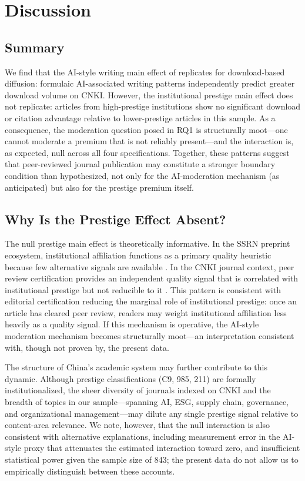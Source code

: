 \documentclass[12pt,a4paper]{article}
\begin{document}
\section{Discussion}
\label{sec:discussion}

\subsection{Summary}

We find that the AI-style writing main effect of \citet{JoLi2026}
replicates for download-based diffusion: formulaic AI-associated
writing patterns independently predict greater download volume on CNKI.
However, the institutional prestige main effect does not replicate:
articles from high-prestige institutions show no significant download
or citation advantage relative to lower-prestige articles in this sample.
As a consequence, the moderation question posed in RQ1 is structurally
moot---one cannot moderate a premium that is not reliably present---and
the interaction is, as expected, null across all four specifications.
Together, these patterns suggest that peer-reviewed journal publication
may constitute a stronger boundary condition than hypothesized, not only
for the AI-moderation mechanism (as anticipated) but also for the
prestige premium itself.

\subsection{Why Is the Prestige Effect Absent?}

The null prestige main effect is theoretically informative.
In the SSRN preprint ecosystem, institutional affiliation functions as
a primary quality heuristic because few alternative signals are
available \citep{JoLi2026}.
In the CNKI journal context, peer review certification provides an
independent quality signal that is correlated with institutional
prestige but not reducible to it \citep{Bornmann2008}.
This pattern is consistent with editorial certification reducing the
marginal role of institutional prestige: once an article has cleared
peer review, readers may weight institutional affiliation less heavily
as a quality signal.
If this mechanism is operative, the AI-style moderation mechanism
becomes structurally moot---an interpretation consistent with, though
not proven by, the present data.

The structure of China's academic system may further contribute to
this dynamic.
Although prestige classifications (C9, 985, 211) are formally
institutionalized, the sheer diversity of journals indexed on CNKI
and the breadth of topics in our sample---spanning AI, ESG, supply
chain, governance, and organizational management---may dilute any
single prestige signal relative to content-area relevance.
We note, however, that the null interaction is also consistent with
alternative explanations, including measurement error in the AI-style
proxy that attenuates the estimated interaction toward zero, and
insufficient statistical power given the sample size of 843;
the present data do not allow us to empirically distinguish between
these accounts.
\end{document}
